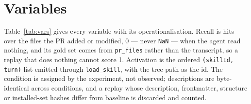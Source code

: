 \documentclass[10pt,conference]{IEEEtran}
\begin{document}
\section{Variables}
\label{sec:vars}
Table~\ref{tab:vars} gives every variable with its operationalisation. Recall is hits over the files the PR added or modified, 0 --- never \texttt{NaN} --- when the agent read nothing, and its gold set comes from \texttt{pr\_files} rather than the transcript, so a replay that does nothing cannot score 1. Activation is the ordered \texttt{(skillId, turn)} list emitted through \texttt{load\_skill}, with the tree path as the id. The condition is assigned by the experiment, not observed; descriptions are byte-identical across conditions, and a replay whose description, frontmatter, structure or installed-set hashes differ from baseline is discarded and counted.
\end{document}
